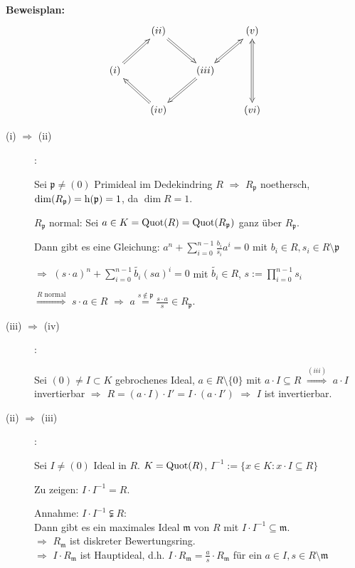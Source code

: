 \documentclass[a4paper, 10pt]{report}
\begin{document}
\begin{Bew}

\textbf{Beweisplan:}
\[
\begin{xy}
\xymatrix{
			     & (ii) \ar@{=>}[dr] &                                & (v) \ar@{<=>}[dd] \\
(i) \ar@{=>}[ur] &                   & (iii) \ar@{=>}[dl] \ar@{<=>}[ur] \\
                 & (iv) \ar@{=>}[ul] &                              & (vi) 
}
\end{xy}
\]

\begin{description}
\item[(i) $\Rightarrow$ (ii)]:

Sei $\mathfrak{p} \neq (0)$ Primideal im Dedekindring $R$ $\Rightarrow$ $R_\mathfrak{p}$ noethersch, $\dim{R_\mathfrak{p}} = \hoe{\mathfrak{p}} = 1$, da $\dim R = 1$.

$R_\mathfrak{p}$ normal: Sei $a \in K = \Quot{R} = \Quot{R_\mathfrak{p}}$ ganz \"uber $R_\mathfrak{p}$.

Dann gibt es eine Gleichung: $a^n + \sum_{i=0}^{n-1} \frac{b_i}{s_i} a^i = 0$ mit $b_i \in R, s_i \in R \setminus \mathfrak{p}$

$\Rightarrow$ $(s \cdot a)^n + \sum_{i=0}^{n-1} \widetilde{b_i} (s a)^i = 0$ mit $\widetilde{b_i} \in R$, $s := \prod_{i=0}^{n-1} s_i$

$\overset{R \text{ normal}}{\Rightarrow}$ $s \cdot a \in R$ $\Rightarrow$ $a
\overset{s \notin \mathfrak{p}}{=} \frac{s \cdot a}{s} \in R_\mathfrak{p}$.

\item[(iii) $\Rightarrow$ (iv)]:

Sei $(0) \neq I \subset K$ gebrochenes Ideal, $a \in R \setminus \{0\}$ mit $a
\cdot I \subseteq R$ $\overset{(iii)}{\Rightarrow}$ $a \cdot I$ invertierbar 
$\Rightarrow$ $R = (a \cdot I) \cdot I' = I \cdot (a \cdot I')$ $\Rightarrow$ $I$ ist invertierbar.

\item[(ii) $\Rightarrow$ (iii)]:

Sei $I \neq (0)$ Ideal in $R$. $K = \Quot{R}$, $I^{-1} := \{ x \in K : x \cdot
I \subseteq R \}$
	
Zu zeigen: $I \cdot I^{-1} = R$.

Annahme: $I \cdot I^{-1} \subsetneqq R$:\\
Dann gibt es ein maximales Ideal $\mathfrak{m}$ von $R$ mit $I \cdot I^{-1} \subseteq \mathfrak{m}$.\\
$\Rightarrow$ $R_\mathfrak{m}$ ist diskreter Bewertungsring.\\
$\Rightarrow$ $I \cdot R_\mathfrak{m}$ ist Hauptideal, d.h. $I \cdot R_\mathfrak{m} = \frac{a}{s} \cdot R_\mathfrak{m}$ f\"ur ein $a \in I, s \in R \setminus \mathfrak{m}$


\end{description}
\end{Bew}
\end{document}
